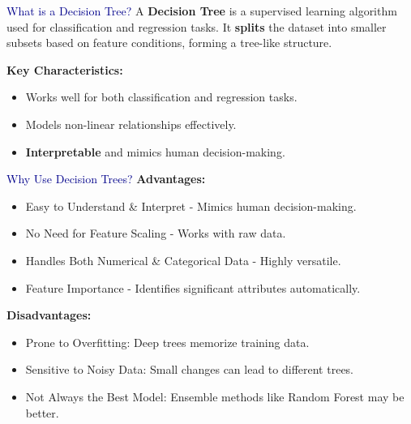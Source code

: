 \begin{frame}{\textcolor{darkblue}{What is a Decision Tree?}}
    A \textbf{Decision Tree} is a supervised learning algorithm used for classification and regression tasks.  
    It \textbf{splits} the dataset into smaller subsets based on feature conditions, forming a tree-like structure.
    
    \vspace{0.4cm}
    \textbf{Key Characteristics:}
    \begin{itemize}
        \item Works well for both classification and regression tasks.
        \item Models non-linear relationships
        effectively.
        \item \textbf{Interpretable} and mimics human decision-making.
    \end{itemize}
\end{frame}

\begin{frame}{\textcolor{darkblue}{Why Use Decision Trees?}}
    \textbf{Advantages:}
    \begin{itemize}
        \item Easy to Understand & Interpret - Mimics human decision-making.
        \item No Need for Feature Scaling - Works with raw data.
        \item Handles Both Numerical & Categorical Data - Highly versatile.
        \item Feature Importance - Identifies significant attributes automatically.
    \end{itemize}
    
    \textbf{Disadvantages:}
    \begin{itemize}
        \item Prone to Overfitting: Deep trees memorize training data.
        \item Sensitive to Noisy Data: Small changes can lead to different trees.
        \item Not Always the Best Model: Ensemble methods like Random Forest may be better.
    \end{itemize}
\end{frame}

